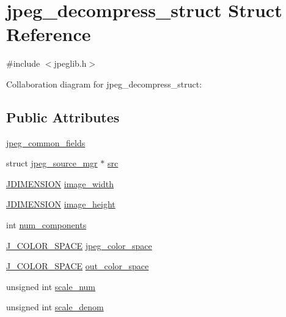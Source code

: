 \hypertarget{structjpeg__decompress__struct}{}\section{jpeg\+\_\+decompress\+\_\+struct Struct Reference}
\label{structjpeg__decompress__struct}


{\ttfamily \#include $<$jpeglib.\+h$>$}



Collaboration diagram for jpeg\+\_\+decompress\+\_\+struct\+:
\subsection*{Public Attributes}
\begin{DoxyCompactItemize}
\item 
\hyperlink{structjpeg__decompress__struct_a62d872add9f188d06908d327da2a24fd}{jpeg\+\_\+common\+\_\+fields}
\item 
struct \hyperlink{structjpeg__source__mgr}{jpeg\+\_\+source\+\_\+mgr} $\ast$ \hyperlink{structjpeg__decompress__struct_aa0f9a673100231cfd81f17b789784785}{src}
\item 
\hyperlink{jmorecfg_8h_a04ed4674f6f1d0d50ec241531e38274f}{J\+D\+I\+M\+E\+N\+S\+I\+O\+N} \hyperlink{structjpeg__decompress__struct_a433c0a54f42dfd3d2977ea967b9a21ee}{image\+\_\+width}
\item 
\hyperlink{jmorecfg_8h_a04ed4674f6f1d0d50ec241531e38274f}{J\+D\+I\+M\+E\+N\+S\+I\+O\+N} \hyperlink{structjpeg__decompress__struct_ad711fae8063a3e75e3c0cccd8512bedf}{image\+\_\+height}
\item 
int \hyperlink{structjpeg__decompress__struct_a15d5e8c34e5c66983eda5c0070f0be95}{num\+\_\+components}
\item 
\hyperlink{jpeglib_8h_a6ea40239360b06efe6377f125f1134f3}{J\+\_\+\+C\+O\+L\+O\+R\+\_\+\+S\+P\+A\+C\+E} \hyperlink{structjpeg__decompress__struct_a980b92cd751cbc72cc7edd1f9ef2c3e4}{jpeg\+\_\+color\+\_\+space}
\item 
\hyperlink{jpeglib_8h_a6ea40239360b06efe6377f125f1134f3}{J\+\_\+\+C\+O\+L\+O\+R\+\_\+\+S\+P\+A\+C\+E} \hyperlink{structjpeg__decompress__struct_a4e69e870df7b81671043374d01efc14f}{out\+\_\+color\+\_\+space}
\item 
unsigned int \hyperlink{structjpeg__decompress__struct_a6c87b02686e69267d26e28c5d3775469}{scale\+\_\+num}
\item 
unsigned int \hyperlink{structjpeg__decompress__struct_ab2621a1694c2b2ea6cfb8618639e5995}{scale\+\_\+denom}

\end{DoxyCompactItemize}
